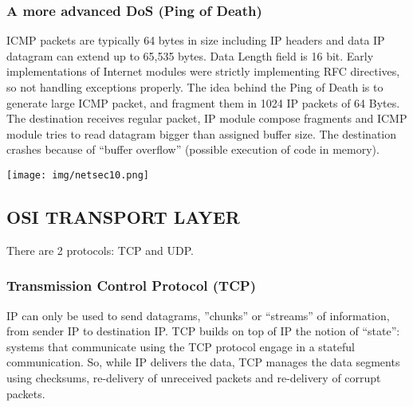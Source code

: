 \documentclass[a4paper, 10pt, titlepage]{article}
\begin{document}
\subsubsection*{A more advanced DoS (Ping of Death)}
ICMP packets are typically 64 bytes in size including IP headers and data IP datagram can extend up to 65,535 bytes. Data Length field is 16 bit. Early implementations of Internet modules were strictly implementing RFC
directives, so not handling exceptions properly. The idea behind the Ping of Death is to generate large ICMP packet, and fragment them in 1024 IP packets of 64 Bytes. The destination receives regular packet, IP module compose fragments and ICMP module tries to read datagram bigger than assigned buffer size. The destination crashes because of “buffer overflow” (possible execution of code in memory).
\begin{center}
	\texttt{[image: img/netsec10.png]}
\end{center}

\subsection{OSI TRANSPORT LAYER}
There are 2 protocols: TCP and UDP.
\subsubsection{Transmission Control Protocol (TCP)}
IP can only be used to send datagrams, ”chunks” or “streams” of information, from sender IP to destination IP. TCP builds on top of IP the notion of “state”: systems that communicate using the TCP protocol engage in a stateful communication.
So, while IP delivers the data, TCP manages the data segments using checksums, re-delivery of unreceived packets and re-delivery of corrupt packets.
\end{document}
